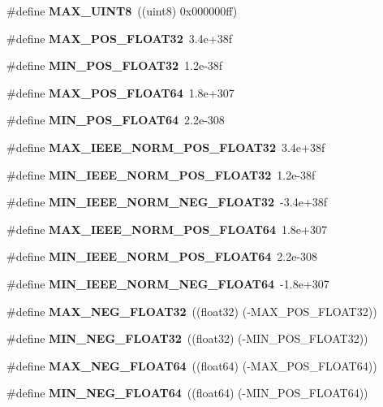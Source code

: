 \begin{CompactItemize}
\item 
\#define \textbf{MAX\_\-UINT8}~((uint8)  0x000000ff)\label{prim__type_8h_05682ca8de174141447ff05a2289a27c}

\item 
\#define \textbf{MAX\_\-POS\_\-FLOAT32}~3.4e+38f\label{prim__type_8h_763737bb762908f1014777705e1bd5e0}

\item 
\#define \textbf{MIN\_\-POS\_\-FLOAT32}~1.2e-38f\label{prim__type_8h_6ebe6d883694f66620b6d2dd94dc38e8}

\item 
\#define \textbf{MAX\_\-POS\_\-FLOAT64}~1.8e+307\label{prim__type_8h_63f40e6ca19e802259413c04cc56bd28}

\item 
\#define \textbf{MIN\_\-POS\_\-FLOAT64}~2.2e-308\label{prim__type_8h_2fc3595771a7d0f944470fd9ba07cfad}

\item 
\#define \textbf{MAX\_\-IEEE\_\-NORM\_\-POS\_\-FLOAT32}~3.4e+38f\label{prim__type_8h_b806e0c70417e38f2302635bbb78c8c5}

\item 
\#define \textbf{MIN\_\-IEEE\_\-NORM\_\-POS\_\-FLOAT32}~1.2e-38f\label{prim__type_8h_8b4a04ec8b6561c6f831dfd2434fd505}

\item 
\#define \textbf{MIN\_\-IEEE\_\-NORM\_\-NEG\_\-FLOAT32}~-3.4e+38f\label{prim__type_8h_7dcce0312b93eb66d4e662fd035560bf}

\item 
\#define \textbf{MAX\_\-IEEE\_\-NORM\_\-POS\_\-FLOAT64}~1.8e+307\label{prim__type_8h_424bb3e6f9a39ec4d9f0ed965ab92026}

\item 
\#define \textbf{MIN\_\-IEEE\_\-NORM\_\-POS\_\-FLOAT64}~2.2e-308\label{prim__type_8h_a8adb129a54c32e19ba7cc9171779687}

\item 
\#define \textbf{MIN\_\-IEEE\_\-NORM\_\-NEG\_\-FLOAT64}~-1.8e+307\label{prim__type_8h_d8550cd6490d48fd6f4949626084fbdb}

\item 
\#define \textbf{MAX\_\-NEG\_\-FLOAT32}~((float32) (-MAX\_\-POS\_\-FLOAT32))\label{prim__type_8h_28dec1bda2ada96d7126ef83feae2845}

\item 
\#define \textbf{MIN\_\-NEG\_\-FLOAT32}~((float32) (-MIN\_\-POS\_\-FLOAT32))\label{prim__type_8h_98d8dffc8bc9036591980531b57e7f19}

\item 
\#define \textbf{MAX\_\-NEG\_\-FLOAT64}~((float64) (-MAX\_\-POS\_\-FLOAT64))\label{prim__type_8h_cb6f44b9148976581d01ab2e1313c635}

\item 
\#define \textbf{MIN\_\-NEG\_\-FLOAT64}~((float64) (-MIN\_\-POS\_\-FLOAT64))\label{prim__type_8h_2e65d00cc854972aae6f58d9cb7d383f}

\end{CompactItemize}
